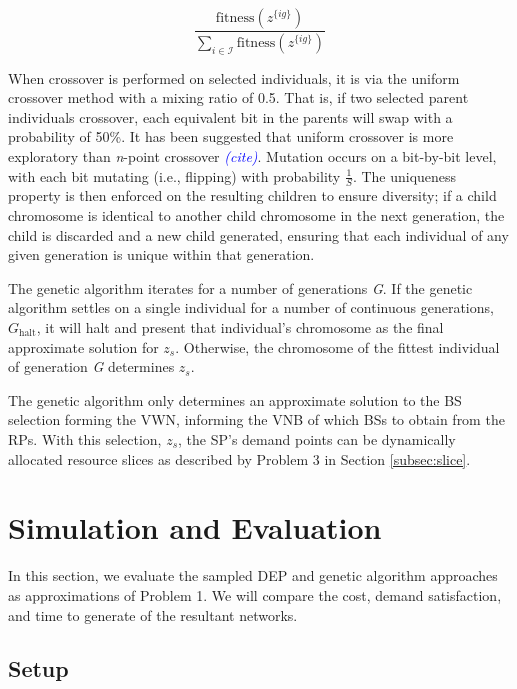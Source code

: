 \documentclass[onecolumn,draftcls]{IEEEtran}
\begin{document}

\[
\frac{\text{fitness}\left( z^{\{ig\}} \right)}{\sum_{i \in \mathcal{I}} \text{fitness}\left( z^{\{ig\}} \right)}
\]

When crossover is performed on selected individuals, it is via the uniform crossover method with a mixing ratio of 0.5.  That is, if two selected parent individuals crossover, each equivalent bit in the parents will swap with a probability of 50\%.  It has been suggested that uniform crossover is more exploratory than \textit{n}-point crossover \textcolor{blue}{\textit{(cite)}}.  Mutation occurs on a bit-by-bit level, with each bit mutating (i.e., flipping) with probability $\frac{1}{S}$.  The uniqueness property is then enforced on the resulting children to ensure diversity; if a child chromosome is identical to another child chromosome in the next generation, the child is discarded and a new child generated, ensuring that each individual of any given generation is unique within that generation.

The genetic algorithm iterates for a number of generations \textit{G}.  If the genetic algorithm settles on a single individual for a number of continuous generations, $G_\text{halt}$, it will halt and present that individual's chromosome as the final approximate solution for $z_s$.  Otherwise, the chromosome of the fittest individual of generation \textit{G} determines $z_s$.

The genetic algorithm only determines an approximate solution to the BS selection forming the VWN, informing the VNB of which BSs to obtain from the RPs.  With this selection, $z_s$, the SP's demand points can be dynamically allocated resource slices as described by Problem 3 in Section \ref{subsec:slice}.

\section{Simulation and Evaluation} \label{sec:sim}
In this section, we evaluate the sampled DEP and genetic algorithm approaches as approximations of Problem 1.  We will compare the cost, demand satisfaction, and time to generate of the resultant networks.

\subsection{Setup} \label{subsec:setup}
\end{document}
